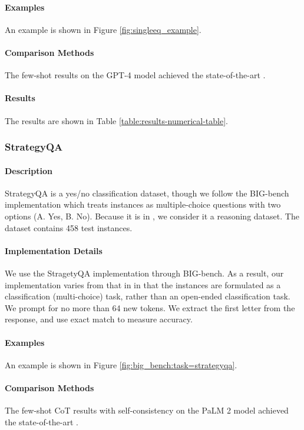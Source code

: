 \paragraph{Examples} An example is shown in Figure \ref{fig:singleeq_example}.

\paragraph{Comparison Methods}
The few-shot results on the GPT-4 model achieved the state-of-the-art \citep{zhao2023automatic}.

\paragraph{Results} The results are shown in Table \ref{table:results-numerical-table}.

\subsubsection{StrategyQA}
\paragraph{Description} StrategyQA \citep{geva2021did} is a yes/no classification dataset, though we follow the BIG-bench implementation which treats instances as multiple-choice questions with two options (A. Yes, B. No). Because it is in \citet{kojima2023large}, we consider it a reasoning dataset. The dataset contains 458 test instances.

\paragraph{Implementation Details}
We use the StragetyQA implementation through BIG-bench. As a result, our implementation varies from that in \citet{kojima2023large} in that the instances are formulated as a classification (multi-choice) task, rather than an open-ended classification task. We prompt for no more than 64 new tokens. We extract the first letter from the response, and use exact match to measure accuracy.

\paragraph{Examples} An example is shown in Figure \ref{fig:big_bench:task=strategyqa}.

\paragraph{Comparison Methods}
The few-shot CoT results with self-consistency on the PaLM 2 model achieved the state-of-the-art \citep{anil2023palm}.

